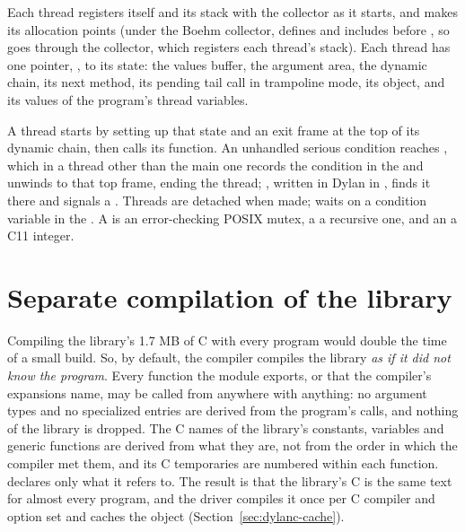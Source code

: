 Each thread registers itself and its stack with the collector as it
starts, and makes its allocation points (under the Boehm collector,
 defines  and includes 
before , so  goes through the
collector, which registers each thread's stack). Each thread has one
 pointer, , to its state: the
values buffer, the argument area, the dynamic chain, its next method,
its pending tail call in trampoline mode, its  object,
and its values of the program's thread variables.

A thread starts by setting up that state and an exit frame at the top of
its dynamic chain, then calls its function. An unhandled serious
condition reaches , which in a thread other than
the main one records the condition in the  and unwinds to
that top frame, ending the thread; , written in Dylan
in , finds it there and signals a
. Threads are detached when made; 
waits on a condition variable in the . A 
is an error-checking POSIX mutex, a  a recursive
one, and an  a C11  integer.

\section{Separate compilation of the library}\label{sec:internals-separate}

Compiling the library's 1.7 MB of C with every program would double
the time of a small build. So, by default, the compiler compiles the
library \emph{as if it did not know the program}. Every function the
 module exports, or that the compiler's expansions name, may
be called from anywhere with anything: no argument types and no
specialized entries are derived from the program's calls, and nothing of
the library is dropped. The C names of the library's constants,
variables and generic functions are derived from what they are, not
from the order in which the compiler met them, and its C temporaries are
numbered within each function.  declares only
what it refers to. The result is that the library's C is the same text
for almost every program, and the driver compiles it once per C compiler
and option set and caches the object (Section~\ref{sec:dylanc-cache}).

